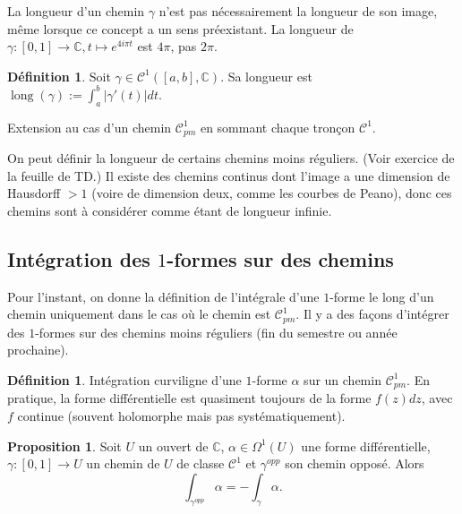 \documentclass[11pt,a4paper]{article}
\newcommand{\C}{\mathbb{C}}
\theoremstyle{definition}
\newtheorem{proposition}[theoreme]{Proposition}
\newtheorem{definition}[theoreme]{D\'efinition}
\newtheorem{definitions}[theoreme]{D\'efinition}
\theoremstyle{plain}
\begin{document}
\begin{attention}
La longueur d'un chemin $\gamma$ n'est pas nécessairement la longueur de son image, même lorsque ce concept a un sens préexistant. La longueur de $\gamma : [0,1]\to\C, t\mapsto e^{4i\pi t}$ est $4\pi$, pas $2\pi$.
\end{attention}

\begin{definition}
Soit $\gamma \in \mathcal C^1([a,b],\C)$.
Sa longueur est $\operatorname{long}(\gamma) := \int_a^b |\gamma'(t)|dt$.

Extension au cas d'un chemin $\mathcal C^1_{pm}$ en sommant chaque tronçon $\mathcal C^1$.
\end{definition}

\begin{remarque}
On peut définir la longueur de certains chemins moins réguliers. (Voir exercice de la feuille de TD.)
Il existe des chemins continus dont l'image a une dimension de Hausdorff $>1$ (voire de dimension deux, comme les courbes de Peano), donc ces chemins sont à considérer comme étant de longueur \og infinie\fg.
\end{remarque}

\subsection{Intégration des $1$-formes sur des chemins}

\begin{remarque}
Pour l'instant, on donne la définition de l'intégrale d'une $1$-forme le long d'un chemin uniquement dans le cas où le chemin est $\mathcal C^1_{pm}$. Il y a des façons d'intégrer des $1$-formes sur des chemins moins réguliers (fin du semestre ou année prochaine).
\end{remarque}

\begin{definitions}
Intégration curviligne d'une $1$-forme $\alpha$ sur un chemin $\mathcal C^1_{pm}$. En pratique, la forme différentielle est quasiment toujours de la forme $f(z)dz$, avec $f$ continue (souvent holomorphe mais pas systématiquement).
\end{definitions}

\begin{proposition}
Soit $U$ un ouvert de $\C$, $\alpha\in \Omega^1(U)$ une forme différentielle,  $\gamma:[0,1]\to U$ un chemin de $U$ de classe $\mathcal C^1$ et $\gamma^{opp}$ son chemin opposé.
Alors 
\[  \int_{\gamma^{opp}} \alpha = -\int_\gamma \alpha.\]
\end{proposition}
\end{document}
